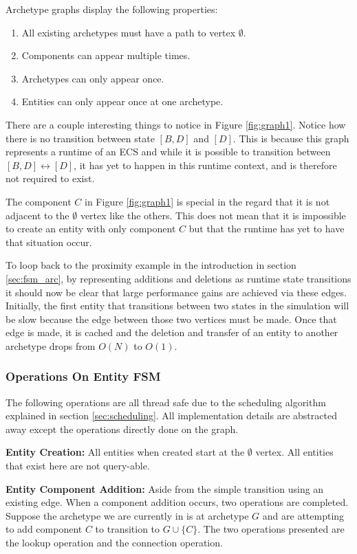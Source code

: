 Archetype graphs display the following properties:

\begin{enumerate}
    \item All existing archetypes must have a path to vertex $\emptyset$.
    \item Components can appear multiple times.
    \item Archetypes can only appear once.
    \item Entities can only appear once at one archetype.
\end{enumerate}

There are a couple interesting things to notice in Figure \ref{fig:graph1}. Notice how there is no transition between state $[B,D]$ and $[D]$. This is because this graph represents a runtime of an ECS and while it is possible to transition between $[B,D] \leftrightarrow [D]$, it has yet to happen in this runtime context, and is therefore not required to exist. 

The component $C$ in Figure \ref{fig:graph1} is special in the regard that it is not adjacent to the $\emptyset$ vertex like the others. This does not mean that it is impossible to create an entity with only component $C$ but that the runtime has yet to have that situation occur.

To loop back to the proximity example in the introduction in section \ref{sec:fsm_arc}, by representing additions and deletions as runtime state transitions it should now be clear that large performance gains are achieved via these edges. Initially, the first entity that transitions between two states in the simulation will be slow because the edge between those two vertices must be made. Once that edge is made, it is cached and the deletion and transfer of an entity to another archetype drops from $O(N)$ to $O(1)$.

\subsubsection{Operations On Entity FSM}
The following operations are all thread safe due to the scheduling algorithm explained in section \ref{sec:scheduling}. All implementation details are abstracted away except the operations directly done on the graph. 

\textbf{Entity Creation:} All entities when created start at the $\emptyset$ vertex. All entities that exist here are not query-able.

\textbf{Entity Component Addition: } Aside from the simple transition using an existing edge. When a component addition occurs, two operations are completed. Suppose the archetype we are currently in is at archetype $G$ and are attempting to add component $C$ to transition to $G \cup \{C\}$. The two operations presented are the lookup operation and the connection operation.

